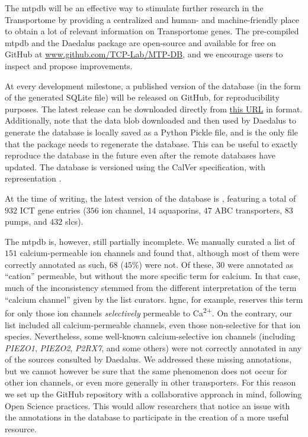 The \gls{mtpdb} will be an effective way to stimulate further research in the Transportome by providing a centralized and human- and machine-friendly place to obtain a lot of relevant information on Transportome genes.
The pre-compiled \gls{mtpdb} and the Daedalus package are open-source and available for free on GitHub at \href{https://github.com/TCP-Lab/MTP-DB/}{www.github.com/TCP-Lab/MTP-DB}, and we encourage users to inspect and propose improvements.

At every development milestone, a published version of the database (in the form of the generated SQLite file) will be released on GitHub, for reproducibility purposes.
The latest release can be downloaded directly from \href{https://github.com/TCP-Lab/MTP-DB/releases/latest/download/MTPDB.sqlite.gz}{this URL} in  format.
Additionally, note that the data blob downloaded and then used by Daedalus to generate the database is locally saved as a Python Pickle file, and is the only file that the package needs to regenerate the database.
This can be useful to exactly reproduce the database in the future even after the remote databases have updated.
The database is versioned using the CalVer specification, with representation .

At the time of writing, the latest version of the database is , featuring a total of $932$ ICT gene entries ($356$ ion channel, $14$ aquaporins, $47$ ABC transporters, $83$ pumps, and $432$ \glspl{slc}). 

The \gls{mtpdb} is, however, still partially incomplete.
We manually curated a list of $151$ calcium-permeable ion channels and found that, although most of them were correctly annotated as such, $68$ ($45\%$) were not.
Of these, $30$ were annotated as ``cation'' permeable, but without the more specific term for calcium.
In that case, much of the inconsistency stemmed from the different interpretation of the term ``calcium channel'' given by the list curators.
\gls{hgnc}, for example, reserves this term for only those ion channels \textit{selectively} permeable to Ca\textsuperscript{2+}.
On the contrary, our list included all calcium-permeable channels, even those non-selective for that ion species.
Nevertheless, some well-known calcium-selective ion channels (including \textit{PIEZO1}, \textit{PIEZO2}, \textit{P2RX7}, and some others) were not correctly annotated in any of the sources consulted by Daedalus.
We addressed these missing annotations, but we cannot however be sure that the same phenomenon does not occur for other ion channels, or even more generally  in other transporters.
For this reason we set up the GitHub repository with a collaborative approach
in mind, following Open Science practices.
This would allow researchers that notice an issue with the annotations in the database to participate in the creation of a more useful resource.

